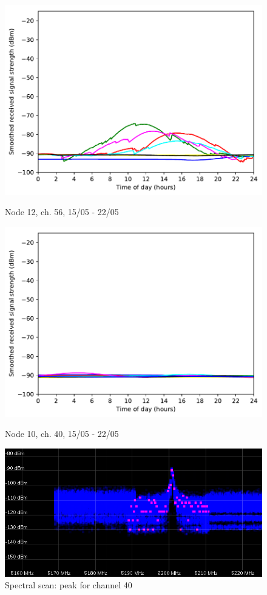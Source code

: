 \documentclass[a4paper, 11pt]{article}
\begin{document}
\begin{figure}[!ht]
\begin{minipage}{0.47\textwidth}
	\includegraphics[width=\textwidth]{images/5_GHz/cot-node12-student_2017-05-21_chan56_image.pdf}
	\caption{Node 12, ch. 56, 15/05 - 22/05}
	\label{node12_ch56_usage}
\end{minipage}\hfill
\begin{minipage}{0.47\textwidth}
	\centering
	\includegraphics[width=\textwidth]{images/5_GHz/cot-node10-student_2017-05-22_chan40_image.pdf}
	\caption{Node 10, ch. 40, 15/05 - 22/05}
	\label{node10_ch40_usage}
\end{minipage}\hfill

	\centering
	\includegraphics[width=\textwidth]{ch40_peak.png}
	\caption{Spectral scan: peak for channel 40}
	\label{ch40_peak}


\end{figure}
\end{document}

